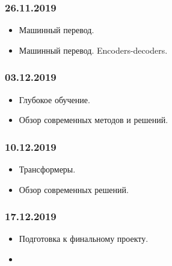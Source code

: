 \documentclass[a4paper,11pt]{article}
\begin{document}
\subsubsection{26.11.2019}
\begin{itemize}
	\item Машинный перевод.
	\item Машинный перевод. Encoders-decoders. 
\end{itemize}
\subsubsection{03.12.2019}
\begin{itemize}
	\item Глубокое обучение.
	\item Обзор современных методов и решений.  
\end{itemize}

\subsubsection{10.12.2019}
\begin{itemize}
	\item Трансформеры.
\item Обзор современных решений.  
\end{itemize}
\subsubsection{17.12.2019}
\begin{itemize}
	\item Подготовка к финальному проекту. 
	\item  
\end{itemize}
\end{document}
